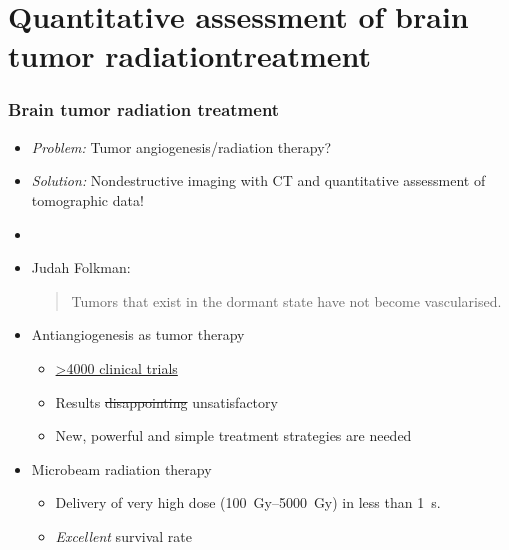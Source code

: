\documentclass{beamer}					%
\newcommand{\uct}{\si{\micro}CT\xspace}
\begin{document}
\section{Quantitative assessment of brain tumor radiation\newline treatment}
\label{sec:grenoble}
\begin{frame}
	\frametitle{Brain tumor radiation treatment}
	\begin{itemize}
		\item \emph{Problem:} Tumor angiogenesis/radiation therapy?
		\pause
		\item \emph{Solution:} Nondestructive imaging with \uct and quantitative assessment of tomographic data!
		\item[]
		\pause
		\item Judah Folkman: \blockquote[\cite{Sherwood1971}]{Tumors that exist in the dormant state have not become vascularised.}
		\item Antiangiogenesis as tumor therapy
		\begin{itemize}
			\item \href{https://clinicaltrials.gov/ct2/results?term=antiangiogenic}{\textgreater4000 clinical trials}
			\item Results \sout{disappointing} unsatisfactory
			\item New, powerful and simple treatment strategies are needed
		\end{itemize}
		\item Microbeam radiation therapy
		\begin{itemize}
			\item Delivery of very high dose (\SIrange{100}{5000}{\gray}) in less than \SI{1}{\second}.
			\item \emph{Excellent} survival rate \cite{Laissue1998}
		\end{itemize}
	\end{itemize}
\end{frame}
\end{document}

